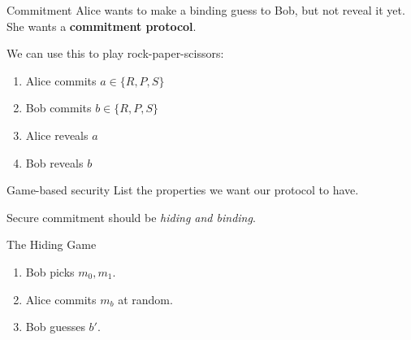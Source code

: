 \documentclass{beamer}
\begin{document}
\begin{frame}{Commitment}
	Alice wants to make a binding guess to Bob, but not reveal it yet. \pause
	She wants a \textbf{commitment protocol}. \pause

	We can use this to play rock-paper-scissors: \pause
	\begin{enumerate}
		\item Alice commits $a\in\{R,P,S\}$ \pause
		\item Bob commits $b\in\{R,P,S\}$ \pause
		\item Alice reveals $a$ \pause
		\item Bob reveals $b$
	\end{enumerate}
\end{frame}



\begin{frame}{Game-based security}
	\pause List the properties we want our protocol to have.\pause

	Secure commitment should be\pause{} \emph{hiding and binding}.\pause

	\begin{block}{The Hiding Game}
		\begin{enumerate}
			\item Bob picks $m_0,m_1$.\pause
			\item Alice commits $m_b$ at random.\pause
			\item Bob guesses $b'$.
		\end{enumerate}
	\end{block}
\end{frame}
\end{document}
